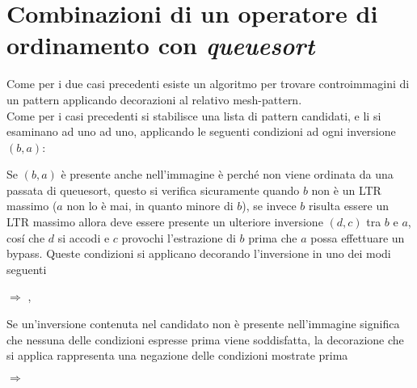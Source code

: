 \section*{Combinazioni di un operatore di ordinamento con \textit{queuesort}}
Come per i due casi precedenti esiste un algoritmo per trovare controimmagini di un pattern applicando decorazioni al relativo mesh-pattern.\\
Come per i casi precedenti si stabilisce una lista di pattern candidati, e li si esaminano ad uno ad uno, applicando le seguenti condizioni ad ogni inversione $(b,a)$:
\begin{description} 
	\item Se $(b,a)$ \`e presente anche nell'immagine \`e perch\'e non viene ordinata da una passata di queuesort, questo si verifica sicuramente quando $b$ non \`e un LTR massimo ($a$ non lo \`e mai, in quanto minore di $b$), se invece $b$ risulta essere un LTR massimo allora deve essere presente un ulteriore inversione $(d,c)$ tra $b$ e $a$, cos\'i che $d$ si accodi e $c$ provochi l'estrazione di $b$ prima che $a$ possa effettuare un bypass. Queste condizioni si applicano decorando l'inversione in uno dei modi seguenti
	\begin{center}
		 $\Rightarrow$
		,
	\end{center}
	\item Se un'inversione contenuta nel candidato non \`e presente nell'immagine significa che nessuna delle condizioni espresse prima viene soddisfatta, la decorazione che si applica rappresenta una negazione delle condizioni mostrate prima
	\begin{center}
		 $\Rightarrow$
	\end{center}
\end{description}

